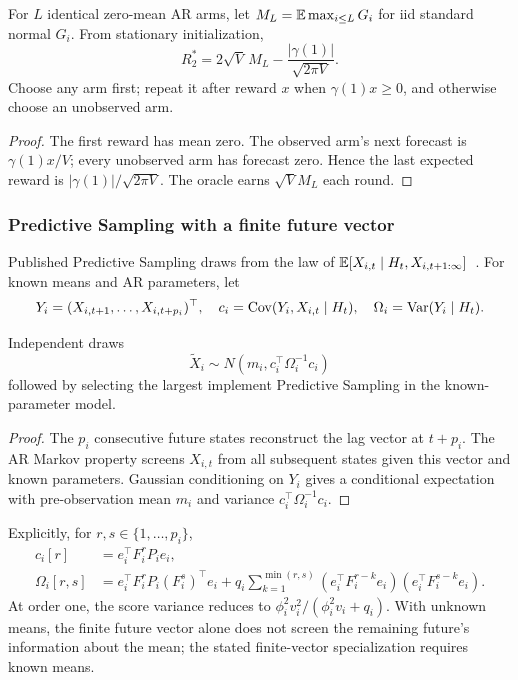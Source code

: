 \begin{corollary}
For $L$ identical zero-mean AR arms, let $M_L=\mathbb E\max_{i\leq L}G_i$ for iid standard normal $G_i$. From stationary initialization,
\begin{equation}
\boxed{R_2^*=2\sqrt V\,M_L-\frac{|\gamma(1)|}{\sqrt{2\pi V}}.}
\end{equation}
Choose any arm first; repeat it after reward $x$ when $\gamma(1)x\geq0$, and otherwise choose an unobserved arm.
\end{corollary}
\begin{proof}
The first reward has mean zero. The observed arm's next forecast is $\gamma(1)x/V$; every unobserved arm has forecast zero. Hence the last expected reward is $|\gamma(1)|/\sqrt{2\pi V}$. The oracle earns $\sqrt V M_L$ each round.
\end{proof}

\subsubsection{Predictive Sampling with a finite future vector}
Published Predictive Sampling draws from the law of $\mathbb E[X_{i,t}\mid H_t,X_{i,t+1:\infty}]$~\cite{collected10}. For known means and AR parameters, let
\[
Y_i=(X_{i,t+1},\ldots,X_{i,t+p_i})^\top,\quad
c_i=\operatorname{Cov}(Y_i,X_{i,t}\mid H_t),\quad
\Omega_i=\operatorname{Var}(Y_i\mid H_t).
\]

\begin{proposition}
Independent draws
\begin{equation}
\boxed{\widetilde X_i\sim N(m_i,c_i^\top\Omega_i^{-1}c_i)}
\label{ar_p_bandits:eq:ps}
\end{equation}
followed by selecting the largest implement Predictive Sampling in the known-parameter model.
\end{proposition}
\begin{proof}
The $p_i$ consecutive future states reconstruct the lag vector at $t+p_i$. The AR Markov property screens $X_{i,t}$ from all subsequent states given this vector and known parameters. Gaussian conditioning on $Y_i$ gives a conditional expectation with pre-observation mean $m_i$ and variance $c_i^\top\Omega_i^{-1}c_i$.
\end{proof}
Explicitly, for $r,s\in\{1,\ldots,p_i\}$,
\begin{align}
c_i[r]&=e_i^\top F_i^rP_ie_i,\\
\Omega_i[r,s]&=e_i^\top F_i^rP_i(F_i^s)^\top e_i
+q_i\sum_{k=1}^{\min(r,s)}(e_i^\top F_i^{r-k}e_i)(e_i^\top F_i^{s-k}e_i).
\end{align}
At order one, the score variance reduces to $\phi_i^2v_i^2/(\phi_i^2v_i+q_i)$. With unknown means, the finite future vector alone does not screen the remaining future's information about the mean; the stated finite-vector specialization requires known means.

